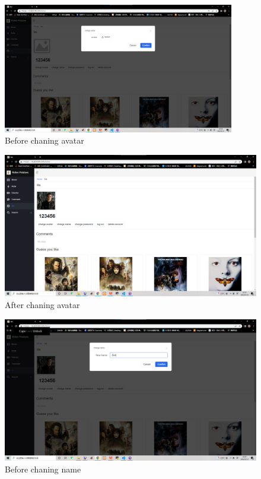 \begin{CJK*}{UTF8}{gbsn}
    \begin{figure}[htbp]
    \centering
    \includegraphics[width=0.9\textwidth]{res_avatar1.png}
    \caption{Before chaning avatar}
    \end{figure}
    
    \begin{figure}[htbp]
    \centering
    \includegraphics[width=1\textwidth]{res_avatar2.png}
    \caption{After chaning avatar}
    \end{figure}
    
    \begin{figure}[htbp]
    \centering
    \includegraphics[width=1\textwidth]{res_name1.png}
    \caption{Before chaning name}
    \end{figure}
    

\end{CJK*}
